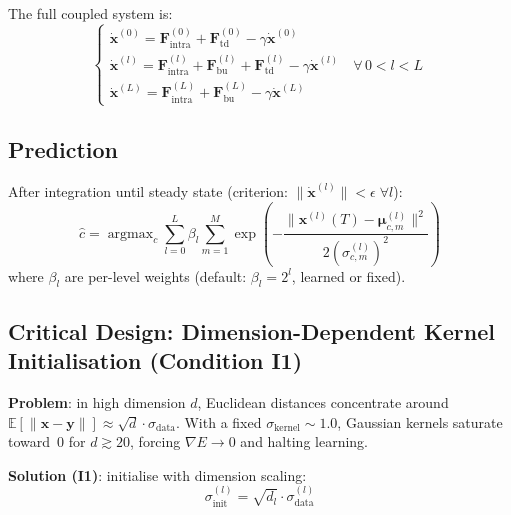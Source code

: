 \documentclass[11pt,a4paper]{article}
\begin{document}
\medskip
The full coupled system is:
\begin{equation}
\begin{cases}
  \dot{\mathbf{x}}^{(0)} = \mathbf{F}^{(0)}_{\mathrm{intra}}
                           + \mathbf{F}^{(0)}_{\mathrm{td}} - \gamma\dot{\mathbf{x}}^{(0)} \\
  \dot{\mathbf{x}}^{(l)} = \mathbf{F}^{(l)}_{\mathrm{intra}}
                           + \mathbf{F}^{(l)}_{\mathrm{bu}}
                           + \mathbf{F}^{(l)}_{\mathrm{td}} - \gamma\dot{\mathbf{x}}^{(l)}
                           \quad \forall\, 0 < l < L \\
  \dot{\mathbf{x}}^{(L)} = \mathbf{F}^{(L)}_{\mathrm{intra}}
                           + \mathbf{F}^{(L)}_{\mathrm{bu}} - \gamma\dot{\mathbf{x}}^{(L)}
\end{cases}
\end{equation}

\subsection{Prediction}

After integration until steady state (criterion: $\|\dot{\mathbf{x}}^{(l)}\| < \epsilon\;\forall l$):
\begin{equation}
  \hat{c} = \operatorname{argmax}_c \sum_{l=0}^{L} \beta_l \sum_{m=1}^{M}
    \exp\!\left(-\frac{\|\mathbf{x}^{(l)}(T) - \boldsymbol{\mu}^{(l)}_{c,m}\|^2}
                      {2(\sigma^{(l)}_{c,m})^2}\right)
\end{equation}
where $\beta_l$ are per-level weights (default: $\beta_l = 2^l$, learned or fixed).

\subsection{Critical Design: Dimension-Dependent Kernel Initialisation (Condition I1)}

\textbf{Problem}: in high dimension $d$, Euclidean distances concentrate around
$\mathbb{E}[\|\mathbf{x}-\mathbf{y}\|] \approx \sqrt{d}\cdot\sigma_{\mathrm{data}}$.
With a fixed $\sigma_{\mathrm{kernel}} \sim 1.0$, Gaussian kernels saturate toward~0 for
$d \gtrsim 20$, forcing $\nabla E \to 0$ and halting learning.

\textbf{Solution (I1)}: initialise with dimension scaling:
\begin{equation}
  \sigma^{(l)}_{\mathrm{init}} = \sqrt{d_l} \cdot \sigma^{(l)}_{\mathrm{data}}
\end{equation}
\end{document}

